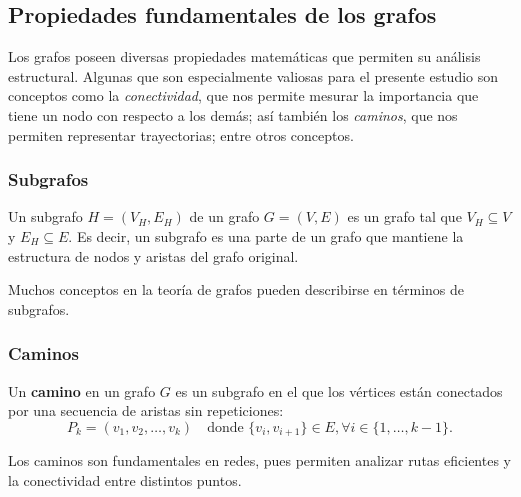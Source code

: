 \documentclass[openany]{book}
\begin{document}
\begin{itemize}
\begin{center}
				\end{center}

			\end{itemize}

		\subsection{Propiedades fundamentales de los grafos}
			Los grafos poseen diversas propiedades matemáticas que permiten su análisis estructural.
			Algunas que son especialmente valiosas para el presente estudio son conceptos como la \textit{conectividad}, que nos permite mesurar la importancia que tiene un nodo con respecto a los demás; así también los \textit{caminos}, que nos permiten representar trayectorias; entre otros conceptos.

			\subsubsection{Subgrafos}

			Un subgrafo $H = (V_H, E_H)$ de un grafo $G = (V, E)$ es un grafo tal que $V_H \subseteq V$ y $E_H \subseteq E$.
			Es decir, un subgrafo es una parte de un grafo que mantiene la estructura de nodos y aristas del grafo original.

			Muchos conceptos en la teoría de grafos pueden describirse en términos de subgrafos.

			\subsubsection{Caminos}

			Un \textbf{camino} en un grafo $G$ es un subgrafo en el que los vértices están conectados por una secuencia de aristas sin repeticiones:
			\begin{equation}
				P_k = (v_1, v_2, \dots, v_k) \quad \text{donde } \{v_i, v_{i+1}\} \in E, \forall i \in \{1, \dots, k-1\}.
			\end{equation}

			Los caminos son fundamentales en redes, pues permiten analizar rutas eficientes y la conectividad entre distintos puntos.
\end{document}
